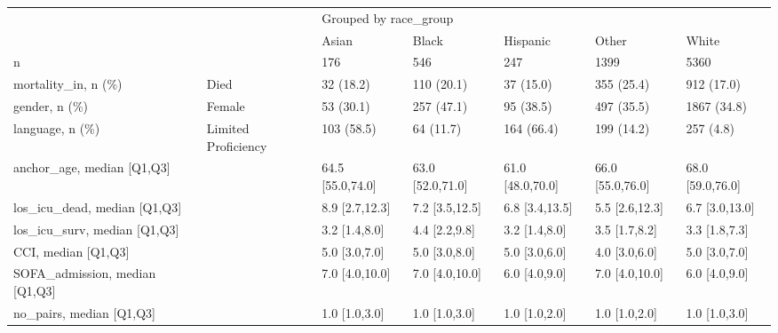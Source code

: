 \begin{tabular}{lllllll}
\toprule
                         &                     & \multicolumn{5}{l}{Grouped by race\_group} \\
                         &                     &                 Asian &             Black &          Hispanic &             Other &             White \\
\midrule
n & {} &                   176 &               546 &               247 &              1399 &              5360 \\
mortality\_in, n (\%) & Died &             32 (18.2) &        110 (20.1) &         37 (15.0) &        355 (25.4) &        912 (17.0) \\
gender, n (\%) & Female &             53 (30.1) &        257 (47.1) &         95 (38.5) &        497 (35.5) &       1867 (34.8) \\
language, n (\%) & Limited Proficiency &            103 (58.5) &         64 (11.7) &        164 (66.4) &        199 (14.2) &         257 (4.8) \\
anchor\_age, median [Q1,Q3] &                     &      64.5 [55.0,74.0] &  63.0 [52.0,71.0] &  61.0 [48.0,70.0] &  66.0 [55.0,76.0] &  68.0 [59.0,76.0] \\
los\_icu\_dead, median [Q1,Q3] &                     &        8.9 [2.7,12.3] &    7.2 [3.5,12.5] &    6.8 [3.4,13.5] &    5.5 [2.6,12.3] &    6.7 [3.0,13.0] \\
los\_icu\_surv, median [Q1,Q3] &                     &         3.2 [1.4,8.0] &     4.4 [2.2,9.8] &     3.2 [1.4,8.0] &     3.5 [1.7,8.2] &     3.3 [1.8,7.3] \\
CCI, median [Q1,Q3] &                     &         5.0 [3.0,7.0] &     5.0 [3.0,8.0] &     5.0 [3.0,6.0] &     4.0 [3.0,6.0] &     5.0 [3.0,7.0] \\
SOFA\_admission, median [Q1,Q3] &                     &        7.0 [4.0,10.0] &    7.0 [4.0,10.0] &     6.0 [4.0,9.0] &    7.0 [4.0,10.0] &     6.0 [4.0,9.0] \\
no\_pairs, median [Q1,Q3] &                     &         1.0 [1.0,3.0] &     1.0 [1.0,3.0] &     1.0 [1.0,2.0] &     1.0 [1.0,2.0] &     1.0 [1.0,3.0] \\
\bottomrule
\end{tabular}
